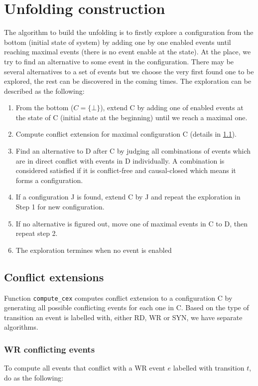 \documentclass{llncs}
\begin{document}
\section{Unfolding construction}
The algorithm to build the unfolding is to firstly explore a configuration from the bottom (initial state of system) by adding one by one enabled events until reaching maximal events (there is no event enable at the state). At the place, we try to find an alternative to some event in the configuration. There may be several alternatives to a set of events but we choose the very first found one to be explored, the rest can be discovered in the coming times.
The exploration can be described as the following: 
\begin{enumerate}
\item 
	From the bottom ($C = \{\bot\}$), extend C by adding one of enabled events at the state of C (initial state at the beginning) until we reach a maximal one.
\item
	Compute conflict extension for maximal configuration C (details in \cref{s:cex}).
\item
	Find an alternative to D after C by judging all combinations of events which are in direct conflict with
	events in D individually. A combination is considered satisfied if it is conflict-free and causal-closed which means it
	forms a configuration.
\item
	If a configuration J is found, extend C by J and repeat the exploration in Step 1 for new configuration.
\item
	If no alternative is figured out, move one of maximal events in C to D, then repeat step 2.
\item
	The exploration termines when no event is enabled
\end{enumerate}

\subsection{Conflict extensions}
\label{s:cex}
Function \verb!compute_cex! computes conflict extension to a configuration C by generating all possible conflicting events for each one in C. Based on the type of transition an event is labelled with, either RD, WR or SYN, we have separate algorithms. 
\subsubsection{WR conflicting events}
\label{ss:cex_wr}
\noindent
To compute all events that conflict with a WR event $e$ labelled with transition $t$, do as the following:
\end{document}
